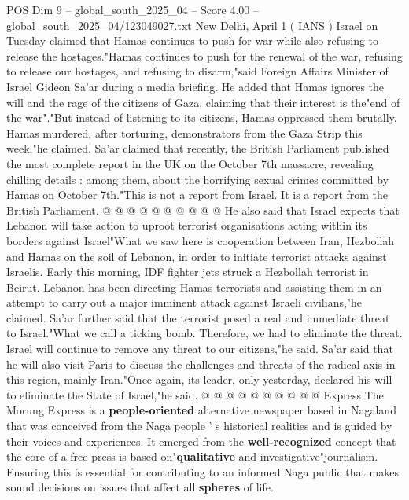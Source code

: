\begin{textsample}{POS Dim 9 – global\_south\_2025\_04 – Score 4.00 – global\_south\_2025\_04/123049027.txt}  \label{ex:f9_pos_184}
New Delhi, April 1 ( IANS ) Israel on Tuesday claimed that Hamas continues to push for war while also refusing to release the hostages."Hamas continues to push for the renewal of the war, refusing to release our hostages, and refusing to disarm,"said Foreign Affairs Minister of Israel Gideon Sa'ar during a media briefing.
He added that Hamas ignores the will and the rage of the citizens of Gaza, claiming that their interest is the"end of the war"."But instead of listening to its citizens, Hamas oppressed them brutally.
Hamas murdered, after torturing, demonstrators from the Gaza Strip this week,"he claimed.
Sa'ar claimed that recently, the British Parliament published the most complete report in the UK on the October 7th massacre, revealing chilling details : among them, about the horrifying sexual crimes committed by Hamas on October 7th."This is not a report from Israel.
It is a report from the British Parliament. @ @ @ @ @ @ @ @ @ @ He also said that Israel expects that Lebanon will take action to uproot terrorist organisations acting within its borders against Israel"What we saw here is cooperation between Iran, Hezbollah and Hamas on the soil of Lebanon, in order to initiate terrorist attacks against Israelis.
Early this morning, IDF fighter jets struck a Hezbollah terrorist in Beirut.
Lebanon has been directing Hamas terrorists and assisting them in an attempt to carry out a major imminent attack against Israeli civilians,"he claimed.
Sa'ar further said that the terrorist posed a real and immediate threat to Israel."What we call a ticking bomb.
Therefore, we had to eliminate the threat.
Israel will continue to remove any threat to our citizens,"he said.
Sa'ar said that he will also visit Paris to discuss the challenges and threats of the radical axis in this region, mainly Iran."Once again, its leader, only yesterday, declared his will to eliminate the State of Israel,"he said. @ @ @ @ @ @ @ @ @ @ Express The Morung Express is a \textbf{people-oriented} alternative newspaper based in Nagaland that was conceived from the Naga people ' s historical realities and is guided by their voices and experiences.
It emerged from the \textbf{well-recognized} concept that the core of a free press is based on"\textbf{qualitative} and investigative"journalism.
Ensuring this is essential for contributing to an informed Naga public that makes sound decisions on issues that affect all \textbf{spheres} of life.

\end{textsample}

